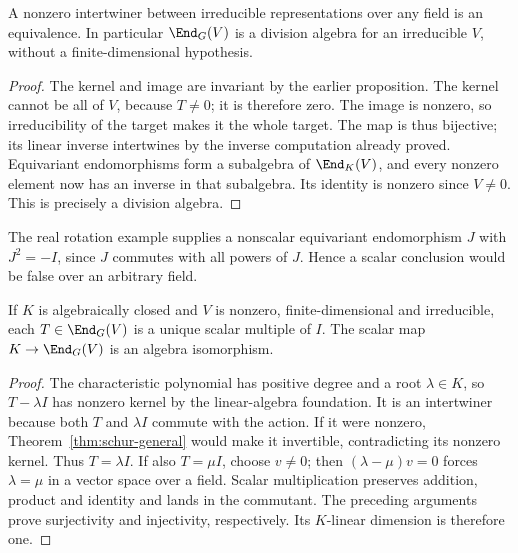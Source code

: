 \begin{theorem}\label{thm:schur-general}
A nonzero intertwiner between irreducible representations over any
field is an equivalence. In particular $\End_G(V)$ is a division
algebra for an irreducible $V$, without a finite-dimensional hypothesis.
\end{theorem}
\begin{proof}
The kernel and image are invariant by the earlier proposition. The
kernel cannot be all of $V$, because $T\ne0$; it is therefore zero.
The image is nonzero, so irreducibility of the target makes it the
whole target. The map is thus bijective; its linear inverse
intertwines by the inverse computation already proved. Equivariant
endomorphisms form a subalgebra of $\End_K(V)$, and every nonzero
element now has an inverse in that subalgebra. Its identity is
nonzero since $V\ne0$. This is precisely a division algebra.
\end{proof}
The real rotation example supplies a nonscalar equivariant
endomorphism $J$ with $J^2=-I$, since $J$ commutes with all powers
of $J$. Hence a scalar conclusion would be false over an arbitrary
field.

\begin{theorem}\label{thm:schur-scalar}
If $K$ is algebraically closed and $V$ is nonzero, finite-dimensional
and irreducible, each $T\in\End_G(V)$ is a unique scalar multiple
of $I$. The scalar map $K\to\End_G(V)$ is an algebra isomorphism.
\end{theorem}
\begin{proof}
The characteristic polynomial has positive degree and a root
$\lambda\in K$, so $T-\lambda I$ has nonzero kernel by the
linear-algebra foundation. It is an intertwiner because both $T$
and $\lambda I$ commute with the action. If it were nonzero,
Theorem~\ref{thm:schur-general} would make it invertible, contradicting
its nonzero kernel. Thus $T=\lambda I$. If also $T=\mu I$, choose
$v\ne0$; then $(\lambda-\mu)v=0$ forces $\lambda=\mu$ in a
vector space over a field. Scalar multiplication preserves addition,
product and identity and lands in the commutant. The preceding
arguments prove surjectivity and injectivity, respectively. Its
$K$-linear dimension is therefore one.
\end{proof}

